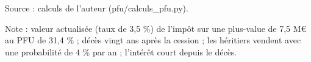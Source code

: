 Source : calculs de l'auteur (pfu/calculs\_pfu.py).\par Note : valeur actualisée (taux de 3,5 \%) de l'impôt sur une plus-value de 7,5 M\euro{} au PFU de 31,4 \% ; décès vingt ans après la cession ; les héritiers vendent avec une probabilité de 4 \% par an ; l'intérêt court depuis le décès.
